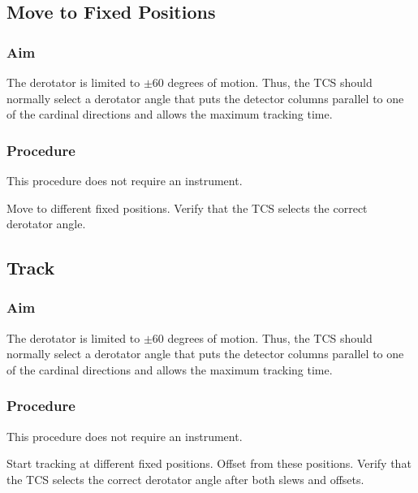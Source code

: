 \documentclass{article}
\begin{document}
\subsection{Move to Fixed Positions}

\subsubsection{Aim}

The derotator is limited to $\pm60$ degrees of motion. Thus, the TCS should normally select a derotator angle that puts the detector columns parallel to one of the cardinal directions and allows the maximum tracking time.

\subsubsection{Procedure}

This procedure does not require an instrument.

Move to different fixed positions. Verify that the TCS selects the correct derotator angle.


\subsection{Track}

\subsubsection{Aim}

The derotator is limited to $\pm60$ degrees of motion. Thus, the TCS should normally select a derotator angle that puts the detector columns parallel to one of the cardinal directions and allows the maximum tracking time.

\subsubsection{Procedure}

This procedure does not require an instrument.

Start tracking at different fixed positions. Offset from these positions. Verify that the TCS selects the correct derotator angle after both slews and offsets.

\end{document}
